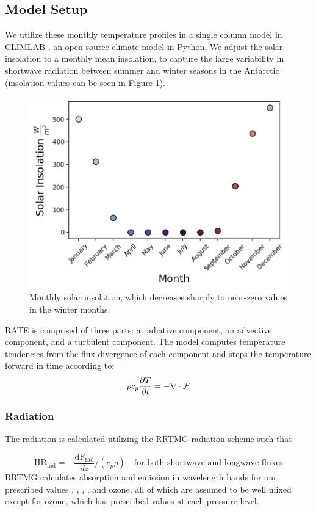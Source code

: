 \documentclass[12]{article}
\begin{document}
\subsection{Model Setup}
We utilize these monthly temperature profiles in a single column model in CLIMLAB \citep{rose_climlab_2018}, an open source climate model in Python. We adjust the solar insolation to a monthly mean insolation, to capture the large variability in shortwave radiation between summer and winter seasons in the Antarctic (insolation values can be seen in Figure \ref{fig:solar_insol}).

\begin{figure}[htb!]
\noindent\includegraphics[width=.5\textwidth]{figures/solar_insol.png}
\centering
\caption{Monthly solar insolation, which decreases sharply to near-zero values in the winter months.}
\label{fig:solar_insol}
\end{figure}

RATE is comprised of three parts: a radiative component, an advective component, and a turbulent component. The model computes temperature tendencies from the flux divergence of each component and steps the temperature forward in time according to:
\begin{equation}
    \rho c_{p} \pdv{T}{t} = -\nabla \cdot \mathbf{\mathcal{F}}
\end{equation}

\subsubsection{Radiation}
The radiation is calculated utilizing the RRTMG radiation scheme \citep{mlawer_radiative_1997} such that 

\begin{equation}
    \text{HR}_{\text{rad}} = -\frac{\text{dF}_{\text{rad}}}{dz} /(c_p \rho) \quad \text{for both shortwave and longwave fluxes}
\end{equation}
RRTMG calculates absorption and emission in wavelength bands for our prescribed values , , , , and ozone, all of which are assumed to be well mixed except for ozone, which has prescribed values at each pressure level.
\end{document}
